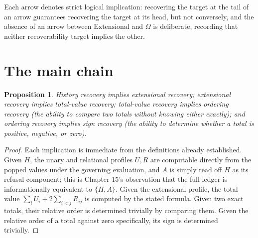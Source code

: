 \documentclass[11pt]{book}
\newtheorem{proposition}[theorem]{Proposition}
\begin{document}
\begin{center}
\end{center}

Each arrow denotes strict logical implication: recovering the target at the tail of an arrow guarantees recovering the target at its head, but not conversely, and the absence of an arrow between $\mathrm{Extensional}$ and $\Omega$ is deliberate, recording that neither recoverability target implies the other.

\section{The main chain}

\begin{proposition}
\label{prop:recovery-chain}
History recovery implies extensional recovery; extensional recovery implies total-value recovery; total-value recovery implies ordering recovery (the ability to compare two totals without knowing either exactly); and ordering recovery implies sign recovery (the ability to determine whether a total is positive, negative, or zero).
\end{proposition}
\begin{proof}
Each implication is immediate from the definitions already established. Given $H$, the unary and relational profiles $U,R$ are computable directly from the popped values under the governing evaluation, and $A$ is simply read off $H$ as its refusal component; this is Chapter 15's observation that the full ledger is informationally equivalent to $\{H,A\}$. Given the extensional profile, the total value $\sum_iU_i+2\sum_{i<j}R_{ij}$ is computed by the stated formula. Given two exact totals, their relative order is determined trivially by comparing them. Given the relative order of a total against zero specifically, its sign is determined trivially.
\end{proof}
\end{document}
